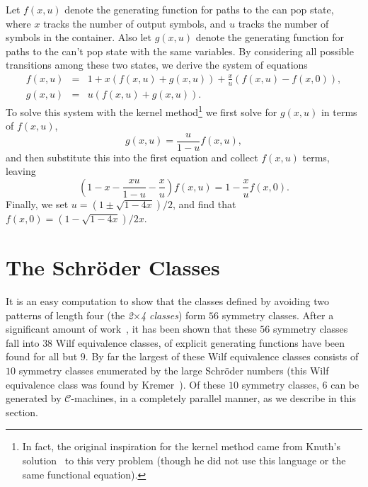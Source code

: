 \documentclass[10pt]{article}
\theoremstyle{plain}
\theoremstyle{definition}
\newcommand{\Av}{\operatorname{Av}}
\newcommand{\C}{\mathcal{C}}
\begin{document}
Let $f(x,u)$ denote the generating function for paths to the can pop state, where $x$ tracks the number of output symbols, and $u$ tracks the number of symbols in the container. Also let $g(x,u)$ denote the generating function for paths to the can't pop state with the same variables. By considering all possible transitions among these two states, we derive the system of equations
\begin{eqnarray*}
	f(x,u)&=&1+x(f(x,u)+g(x,u))+\frac{x}{u}(f(x,u)-f(x,0)),\\
	g(x,u)&=&u(f(x,u)+g(x,u)).
\end{eqnarray*}
To solve this system with the kernel method\footnote{In fact, the original inspiration for the kernel method came from Knuth's solution~\cite[Solution 2.2.1.4]{knuth:the-art-of-comp:1} to this very problem (though he did not use this language or the same functional equation).} we first solve for $g(x,u)$ in terms of $f(x,u)$,
\[
	g(x,u)=\frac{u}{1-u}f(x,u),
\]
and then substitute this into the first equation and collect $f(x,u)$ terms, leaving
\[
	\left(1-x-\frac{xu}{1-u}-\frac{x}{u}\right)f(x,u)=1-\frac{x}{u}f(x,0).
\]
Finally, we set $u=(1\pm\sqrt{1-4x})/2$, and find that $f(x,0)=(1-\sqrt{1-4x})/2x$.


%
%
%
%
%
%
%
%

\section{The Schr\"oder Classes}
\label{sec-schroeder}

It is an easy computation to show that the classes defined by avoiding two patterns of length four (the \emph{2$\times$4 classes}) form $56$ symmetry classes. After a significant amount of work~\cite{bona:the-permutation:,kremer:permutations-wi:,kremer:postscript:-per:,kremer:finite-transiti:,le:wilf-classes-of:}, it has been shown that these $56$ symmetry classes fall into $38$ Wilf equivalence classes, of explicit generating functions have been found for all but $9$. By far the largest of these Wilf equivalence classes consists of $10$ symmetry classes enumerated by the large Schr\"oder numbers (this Wilf equivalence class was found by Kremer~\cite{kremer:permutations-wi:,kremer:postscript:-per:}). Of these $10$ symmetry classes, $6$ can be generated by $\C$-machines, in a completely parallel manner, as we describe in this section.
\end{document}
